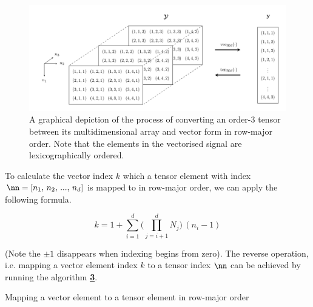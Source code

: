 \begin{figure}[t]
    \begin{center}
        \includegraphics[width=\linewidth]{Figures/tensor_vec.pdf}    
    \end{center}
    \caption[Conversion between a multidimensional array and a vector]{A graphical depiction of the process of converting an order-3 tensor between its multidimensional array and vector form in row-major order. Note that the elements in the vectorised signal are lexicographically ordered. }
    \label{fig:ten_to_vec}
\end{figure}


To calculate the vector index $k$ which a tensor element with index $\nn = [n_1,\, n_2,\, ...,\, n_d]$ is mapped to in row-major order, we can apply the following formula.  

\begin{equation}
    \label{eq:vec}
    k = 1 + \sum_{i=1}^d \Big( \prod_{j=i+1}^d N_j \Big) \, (n_i - 1)
\end{equation}

(Note the $\pm1$ disappears when indexing begins from zero). The reverse operation, i.e. mapping a vector element index $k$ to a tensor index $\nn$ can be achieved by running the algorithm \hyperlink{vectoten}{\textbf{3}}. 


\begin{algorithm}[b]
    \hypertarget{vectoten}{}
    \label{al:vectoten}
    \caption{Mapping a vector element to a tensor element in row-major order}
    \begin{algorithmic}
    \vspace{0.15cm}
    \vspace{0.1cm}
    \vspace{0.25cm}
    \vspace{0.25cm}
    \vspace{0.25cm}
    \vspace{0.15cm}
    \vspace{0.15cm}
    \EndFor
    \vspace{0.25cm}
    \end{algorithmic}
\end{algorithm}



